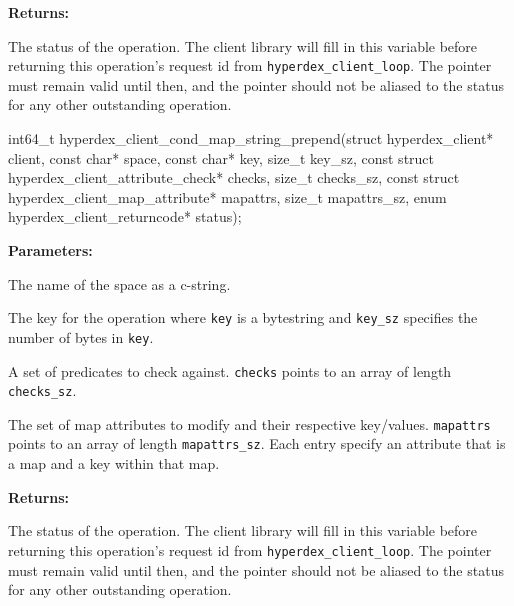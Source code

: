 \noindent\textbf{Returns:}
\begin{description}[labelindent=\widthof{{\texttt{status}}},leftmargin=*,noitemsep,nolistsep,align=right]
\item[\texttt{status}] The status of the operation.  The client library will fill in this variable before returning this operation's request id from \texttt{hyperdex\_client\_loop}.  The pointer must remain valid until then, and the pointer should not be aliased to the status for any other outstanding operation.
\end{description}

\funcsep
\begin{ccode}
int64_t hyperdex_client_cond_map_string_prepend(struct hyperdex_client* client,
                const char* space,
                const char* key, size_t key_sz,
                const struct hyperdex_client_attribute_check* checks, size_t checks_sz,
                const struct hyperdex_client_map_attribute* mapattrs, size_t mapattrs_sz,
                enum hyperdex_client_returncode* status);
\end{ccode}
\funcdesc 

\noindent\textbf{Parameters:}
\begin{description}[labelindent=\widthof{{\texttt{mapattrs}, \texttt{mapattrs\_sz}}},leftmargin=*,noitemsep,nolistsep,align=right]
\item[\texttt{space}] The name of the space as a c-string.
\item[\texttt{key}, \texttt{key\_sz}] The key for the operation where \texttt{key} is a bytestring and \texttt{key\_sz} specifies the number of bytes in \texttt{key}.
\item[\texttt{checks}, \texttt{checks\_sz}] A set of predicates to check against.  \texttt{checks} points to an array of length \texttt{checks\_sz}.
\item[\texttt{mapattrs}, \texttt{mapattrs\_sz}] The set of map attributes to modify and their respective key/values.  \texttt{mapattrs} points to an array of length \texttt{mapattrs\_sz}.  Each entry specify an attribute that is a map and a key within that map.
\end{description}

\noindent\textbf{Returns:}
\begin{description}[labelindent=\widthof{{\texttt{status}}},leftmargin=*,noitemsep,nolistsep,align=right]
\item[\texttt{status}] The status of the operation.  The client library will fill in this variable before returning this operation's request id from \texttt{hyperdex\_client\_loop}.  The pointer must remain valid until then, and the pointer should not be aliased to the status for any other outstanding operation.
\end{description}

